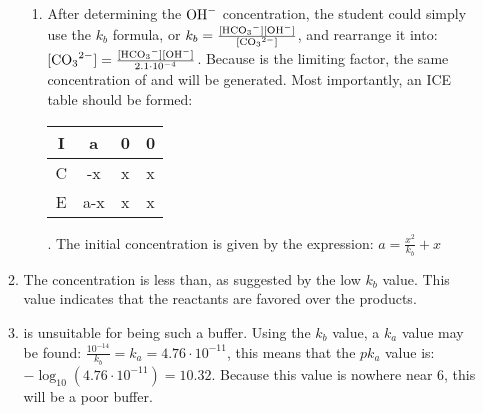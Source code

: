 \documentclass[12pt]{article}
\begin{document}
\begin{enumerate}
\begin{enumerate}
\begin{enumerate}
          \item After determining the $\ce{OH-}$ concentration, the student could simply use the $k_b$ formula, or $k_b=\frac{[\ce{HCO3-}][\ce{OH-}]}{[\ce{CO3^2-}]}$, and rearrange it into: $[\ce{CO3^2-}]=\frac{[\ce{HCO3-}][\ce{OH-}]}{2.1\cdot10^{-4}}$. Because  is the limiting factor, the same concentration of  and  will be generated. Most importantly, an ICE table should be formed: \begin{tabular}{|c|c|c|c|} \hline I & a & 0 & 0\\\hline C & -x & x & x\\ \hline E & a-x & x & x\\\hline\end{tabular}. The initial concentration is given by the expression: $a=\frac{x^2}{k_b}+x$

        \end{enumerate}

      \item The concentration is less than, as suggested by the low $k_b$ value. This value indicates that the reactants are favored over the products.

      \item {} is unsuitable for being such a buffer. Using the $k_b$ value, a $k_a$ value may be found: $\frac{10^{-14}}{k_b}=k_a=4.76\cdot10^{-11}$, this means that the $pk_a$ value is: $-\log_{10}\left( 4.76\cdot10^{-11} \right)=10.32$. Because this value is nowhere near 6, this will be a poor buffer.

    \end{enumerate}

\end{enumerate}
\end{document}
